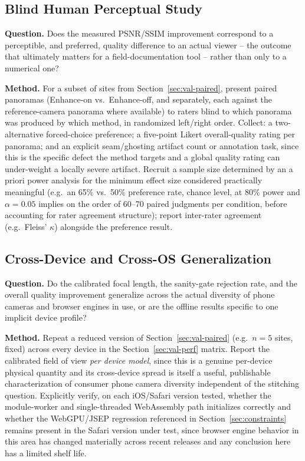\documentclass[11pt]{article}
\begin{document}
\subsection{Blind Human Perceptual Study}
\label{sec:val-perceptual}

\textbf{Question.} Does the measured PSNR/SSIM improvement correspond to a perceptible, and preferred, quality difference to an actual viewer -- the outcome that ultimately matters for a field-documentation tool -- rather than only to a numerical one?

\textbf{Method.} For a subset of sites from Section~\ref{sec:val-paired}, present paired panoramas (Enhance-on vs.\ Enhance-off, and separately, each against the reference-camera panorama where available) to raters blind to which panorama was produced by which method, in randomized left/right order. Collect: a two-alternative forced-choice preference; a five-point Likert overall-quality rating per panorama; and an explicit seam/ghosting artifact count or annotation task, since this is the specific defect the method targets and a global quality rating can under-weight a locally severe artifact. Recruit a sample size determined by an a priori power analysis for the minimum effect size considered practically meaningful (e.g.\ an 65\% vs.\ 50\% preference rate, chance level, at 80\% power and $\alpha=0.05$ implies on the order of 60--70 paired judgments per condition, before accounting for rater agreement structure); report inter-rater agreement (e.g.\ Fleiss' $\kappa$) alongside the preference result.

\subsection{Cross-Device and Cross-OS Generalization}
\label{sec:val-crossdevice}

\textbf{Question.} Do the calibrated focal length, the sanity-gate rejection rate, and the overall quality improvement generalize across the actual diversity of phone cameras and browser engines in use, or are the offline results specific to one implicit device profile?

\textbf{Method.} Repeat a reduced version of Section~\ref{sec:val-paired} (e.g.\ $n=5$ sites, fixed) across every device in the Section~\ref{sec:val-perf} matrix. Report the calibrated field of view \emph{per device model}, since this is a genuine per-device physical quantity and its cross-device spread is itself a useful, publishable characterization of consumer phone camera diversity independent of the stitching question. Explicitly verify, on each iOS/Safari version tested, whether the module-worker and single-threaded WebAssembly path initializes correctly and whether the WebGPU/JSEP regression referenced in Section~\ref{sec:constraints} remains present in the Safari version under test, since browser engine behavior in this area has changed materially across recent releases and any conclusion here has a limited shelf life.
\end{document}

